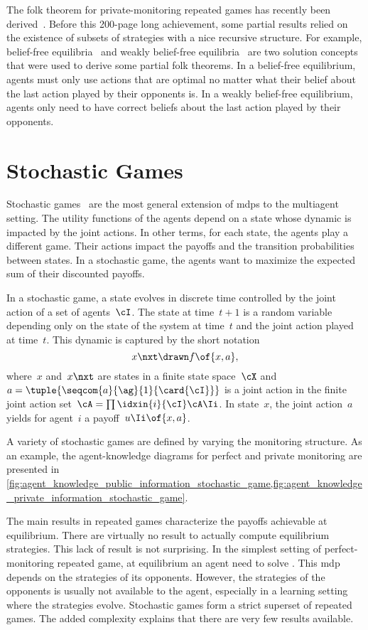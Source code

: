 The folk theorem for private-monitoring repeated games has recently been derived~\cite{sugaya:2011}.
Before this 200-page long achievement, some partial results relied on the existence of subsets of strategies with a nice recursive structure.
For example, belief-free equilibria~\cite{ely_valimaki:2002,ely_horner_olszewski:2005} and weakly belief-free equilibria~\cite{kandori:2011} are two solution concepts that were used to derive some partial folk theorems.
In a belief-free equilibrium, agents must only use actions that are optimal no matter what their belief about the last action played by their opponents is.
In a weakly belief-free equilibrium, agents only need to have correct beliefs about the last action played by their opponents.

\section{Stochastic Games}
Stochastic games~\cite{shapley:1953} are the most general extension of \acp{mdp} to the multiagent setting.
The utility functions of the agents depend on a state whose dynamic is impacted by the joint actions.
In other terms, for each state, the agents play a different game.
Their actions impact the payoffs and the transition probabilities between states.
In a stochastic game, the agents want to maximize the expected sum of their discounted payoffs.

In a stochastic game, a state evolves in discrete time controlled by the joint action of a set of agents~\(\cI\).
The state at time~\(t+1\) is a random variable depending only on the state of the system at time~\(t\) and the joint action played at time~\(t\).
This dynamic is captured by the short notation
\begin{equation*}
x\nxt \drawn f \of {x, a},
\end{equation*}
where~\(x\) and~\(x\nxt\) are states in a finite state space~\(\cX\) and~\(a = \tuple{\seqcom{a}{\ag}{1}{\card{\cI}}}\) is a joint action in the finite joint action set~\(\cA = \prod\idxin{i}{\cI} \cA\Ii\).
In state~\(x\), the joint action~\(a\) yields for agent~\(i\) a payoff~\(u\Ii \of{x, a}\).

A variety of stochastic games are defined by varying the monitoring structure.
As an example, the agent-knowledge diagrams for perfect and private monitoring are presented in \cref{fig:agent_knowledge_public_information_stochastic_game,fig:agent_knowledge_private_information_stochastic_game}.

The main results in repeated games characterize the payoffs achievable at equilibrium.
There are virtually no result to actually compute equilibrium strategies.
This lack of result is not surprising.
In the simplest setting of perfect-monitoring repeated game, at equilibrium an agent need to solve .
This \ac{mdp} depends on the strategies of its opponents.
However, the strategies of the opponents is usually not available to the agent, especially in a learning setting where the strategies evolve.
Stochastic games form a strict superset of repeated games.
The added complexity explains that there are very few results available.

